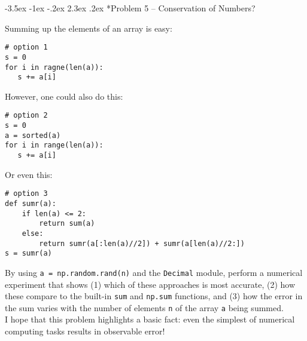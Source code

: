 \documentclass[11pt]{article}
\makeatletter
\renewcommand\section{\@startsection{section}{1}{\z@}%
                                  {-3.5ex \@plus -1ex \@minus -.2ex}%
                                  {2.3ex \@plus.2ex}%
                                  {\normalfont\bfseries}}
\makeatother
\begin{document}
\section*{Problem 5 -- Conservation of Numbers?}

Summing up the elements of an array is easy:
\begin{verbatim}
# option 1
s = 0   
for i in ragne(len(a)):
   s += a[i]
\end{verbatim}
However, one could also do this:
\begin{verbatim}
# option 2
s = 0   
a = sorted(a)
for i in range(len(a)):
   s += a[i]
\end{verbatim}
Or even this:
\begin{verbatim}
# option 3
def sumr(a):
    if len(a) <= 2:
        return sum(a)
    else:
        return sumr(a[:len(a)//2]) + sumr(a[len(a)//2:])
s = sumr(a)
\end{verbatim}
By using {\tt a = np.random.rand(n)} and the {\tt Decimal} module, perform a numerical experiment that shows (1) which of these approaches is most accurate, (2) how these compare to the built-in {\tt sum} and {\tt np.sum} functions, and (3) how the error in the sum varies with the number of elements {\tt n} of the array {\tt a} being summed. \\

I hope that this problem highlights a basic fact: even the simplest of numerical computing tasks results in observable error!
\end{document}
